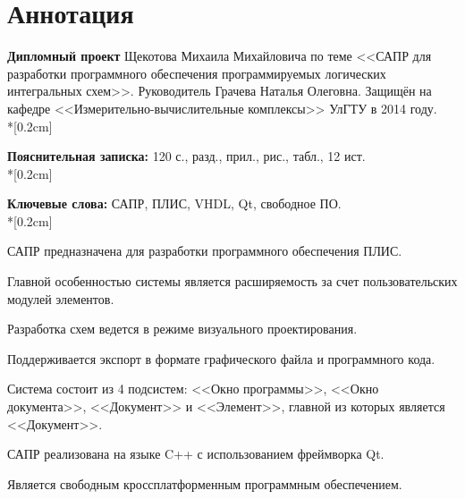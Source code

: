 \section*{Аннотация}

\noindent \textbf{Дипломный проект} Щекотова Михаила Михайловича по теме <<САПР для разработки программного обеспечения программируемых логических интегральных схем>>.
Руководитель Грачева Наталья Олеговна.
Защищён на кафедре <<Измерительно-вычислительные комплексы>> УлГТУ в 2014 году.\\*[0.2cm]

\noindent \textbf{Пояснительная записка:} 120 с.,  разд.,  прил.,  рис.,  табл., 12 ист.\\*[0.2cm]

\noindent \textbf{Ключевые слова:} САПР, ПЛИС, VHDL, Qt, свободное ПО.\\*[0.2cm]

\noindent САПР предназначена для разработки программного обеспечения ПЛИС.

\noindent Главной особенностью системы является расширяемость за счет пользовательских модулей элементов.

\noindent Разработка схем ведется в режиме визуального проектирования.

\noindent Поддерживается экспорт в формате графического файла и программного кода.

\noindent Система состоит из 4 подсистем: <<Окно программы>>, <<Окно документа>>, <<Документ>> и <<Элемент>>, главной из которых является <<Документ>>.

\noindent САПР реализована на языке C++ с использованием фреймворка Qt.

\noindent Является свободным кроссплатформенным программным обеспечением.
